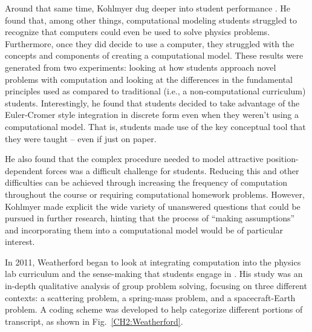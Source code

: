 \documentclass{msuphddissertation}
\begin{document}
\begin{doublespace}
Around that same time, Kohlmyer dug deeper into student performance \cite{Kohlmyer2005}.  He found that, among other things, computational modeling students struggled to recognize that computers could even be used to solve physics problems.  Furthermore, once they did decide to use a computer, they struggled with the concepts and components of creating a computational model.  These results were generated from two experiments: looking at how students approach novel problems with computation and looking at the differences in the fundamental principles used as compared to traditional (i.e., a non-computational curriculum) students.  Interestingly, he found that students decided to take advantage of the Euler-Cromer style integration in discrete form even when they weren't using a computational model.  That is, students made use of the key conceptual tool that they were taught -- even if just on paper.

He also found that the complex procedure needed to model attractive position-dependent forces was a difficult challenge for students.  Reducing this and other difficulties can be achieved through increasing the frequency of computation throughout the course or requiring computational homework problems.  However, Kohlmyer made explicit the wide variety of unanswered questions that could be pursued in further research, hinting that the process of ``making assumptions'' and incorporating them into a computational model would be of particular interest.

In 2011, Weatherford began to look at integrating computation into the physics lab curriculum and the sense-making that students engage in \cite{Weatherford2011}.  His study was an in-depth qualitative analysis of group problem solving, focusing on three different contexts: a scattering problem, a spring-mass problem, and a spacecraft-Earth problem.  A coding scheme was developed to help categorize different portions of transcript, as shown in Fig.~\ref{CH2:Weatherford}.


\end{doublespace}
\end{document}
